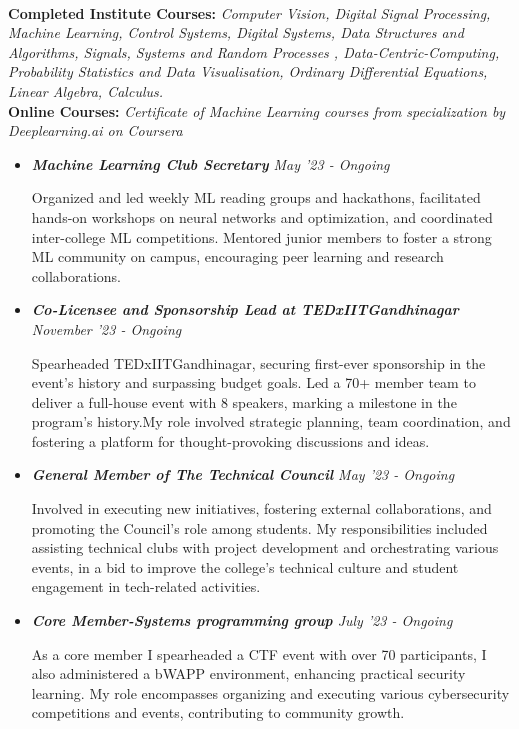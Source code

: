 \documentclass[a4paper,11pt]{cdsTemp}
\begin{document}
\\[0.05cm]\textbf{Completed Institute Courses: }\textit{Computer Vision, Digital Signal Processing, Machine Learning, Control Systems, Digital Systems, Data Structures and Algorithms, Signals, Systems and Random Processes , Data-Centric-Computing, Probability Statistics and Data Visualisation, Ordinary Differential Equations, Linear Algebra, Calculus.}
\\[0.05cm]\textbf{Online Courses:} \textit{Certificate of Machine Learning courses from specialization by Deeplearning.ai on Coursera}


\begin{itemize}
    \item \textit{\textbf{Machine Learning Club Secretary} \hfill \color{red}May '23 - Ongoing}
    
    Organized and led weekly ML reading groups and hackathons, facilitated hands-on workshops on neural networks and optimization, and coordinated inter-college ML competitions. Mentored junior members to foster a strong ML community on campus, encouraging peer learning and research collaborations.
    
    \divider

    \item \textit{\textbf{Co-Licensee and Sponsorship Lead at TEDxIITGandhinagar}  \hfill \color{red}November '23 - Ongoing}

    Spearheaded TEDxIITGandhinagar, securing first-ever sponsorship in the event’s history and surpassing budget
goals. Led a 70+ member team to deliver a full-house event with 8 speakers, marking a milestone in the program’s
history.My role involved strategic planning, team coordination, and fostering a platform for thought-provoking discussions and ideas.

    \divider 

    \item \textit{\textbf{General Member of The Technical Council}  \hfill \color{red}May '23 - Ongoing}

    Involved in executing new initiatives, fostering external collaborations, and promoting the Council's role among students. My responsibilities included assisting technical clubs with project development and orchestrating various events, in a bid to improve the college's technical culture and student engagement in tech-related activities.

    \divider
	
    \item \textit{\textbf{Core Member-Systems programming group}  \hfill \color{red} July '23 - Ongoing}

    As a core member I spearheaded a CTF event with over 70 participants, I also administered a bWAPP environment, enhancing practical security learning. My role encompasses organizing and executing various cybersecurity competitions and events, contributing to community growth.

\end{itemize}
\end{document}
